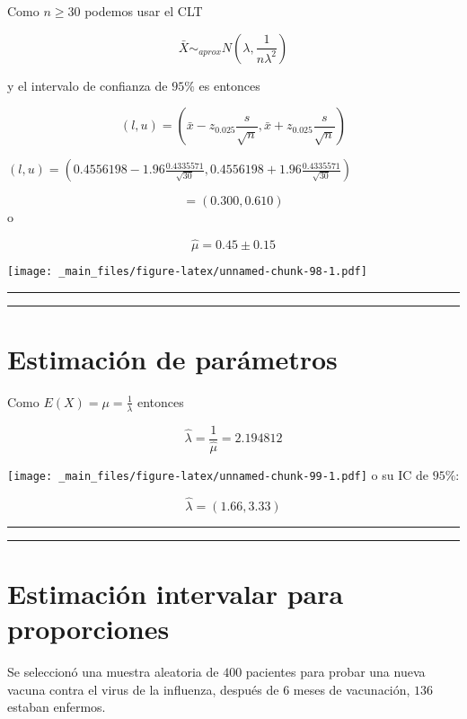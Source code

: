 \documentclass[
]{book}
\begin{document}
Como \(n \geq 30\) podemos usar el CLT

\[\bar{X} \sim_{aprox} N(\lambda, \frac{1}{n\lambda^2})\]

y el intervalo de confianza de \(95\%\) es entonces

\[(l,u)=(\bar{x}-z_{0.025} \frac{s}{\sqrt{n}}, \bar{x}+z_{0.025} \frac{s}{\sqrt {n}})\]

\((l,u)=(0.4556198-1.96\frac{0.4335571}{\sqrt{30}}, 0.4556198+1.96\frac{0.4335571}{\sqrt{30}})\)

\[=(0.300,0.610)\]
o

\[\hat{\mu}=0.45 \pm 0.15\]

\texttt{[image: \_main\_files/figure-latex/unnamed-chunk-98-1.pdf]}

\begin{center}\rule{0.5\linewidth}{0.5pt}\end{center}

\begin{center}\rule{0.5\linewidth}{0.5pt}\end{center}

\hypertarget{estimaciuxf3n-de-paruxe1metros}{%
\section{Estimación de parámetros}\label{estimaciuxf3n-de-paruxe1metros}}

Como \(E(X)=\mu=\frac{1}{\lambda}\) entonces

\[\hat{\lambda}=\frac{1}{\hat{\mu}}=2.194812\]

\texttt{[image: \_main\_files/figure-latex/unnamed-chunk-99-1.pdf]}
o su IC de \(95\%\):

\[\hat{\lambda}= (1.66, 3.33) \]

\begin{center}\rule{0.5\linewidth}{0.5pt}\end{center}

\begin{center}\rule{0.5\linewidth}{0.5pt}\end{center}

\hypertarget{estimaciuxf3n-intervalar-para-proporciones}{%
\section{Estimación intervalar para proporciones}\label{estimaciuxf3n-intervalar-para-proporciones}}

Se seleccionó una muestra aleatoria de \(400\) pacientes para probar una nueva vacuna contra el virus de la influenza, después de \(6\) meses de vacunación, \(136\) estaban enfermos.
\end{document}
